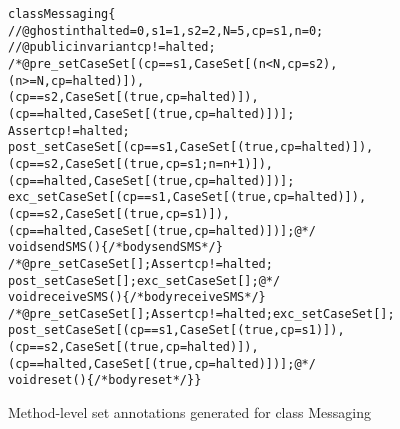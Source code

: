 \hspace{-0.2em}
\begin{figure}[t]
{\small\begin{alltt}
class Messaging \{
//@ ghost int halted = 0, s1 = 1, s2 = 2, N = 5, cp = s1, n = 0;
//@ public invariant cp != halted;\vspace*{.5em}
/*@ pre_set  CaseSet [(cp == s1, CaseSet [(n < N, cp = s2),
                                          (n >= N, cp = halted)]),
                      (cp == s2, CaseSet [(true, cp = halted)]),
                      (cp == halted, CaseSet [(true, cp = halted)])];
             Assert cp != halted;
    post_set CaseSet [(cp == s1, CaseSet [(true, cp = halted)]),
                      (cp == s2, CaseSet [(true, cp = s1; n = n + 1)]),
                      (cp == halted, CaseSet [(true, cp = halted)])];
    exc_set  CaseSet [(cp == s1, CaseSet [(true, cp = halted)]),
                      (cp == s2, CaseSet [(true, cp = s1)]),
                      (cp == halted, CaseSet [(true, cp = halted)])]; @*/
void sendSMS()\{/* body sendSMS */\}\vspace*{.5em}
/*@ pre_set  CaseSet []; Assert cp != halted;
    post_set CaseSet []; exc_set  CaseSet []; @*/
void receiveSMS()\{/* body receiveSMS */\}\vspace*{.5em}
/*@ pre_set  CaseSet []; Assert cp != halted; exc_set CaseSet [];
    post_set CaseSet [(cp == s1, CaseSet [(true, cp = s1)]),
                      (cp == s2, CaseSet [(true, cp = halted)]),
                      (cp == halted, CaseSet [(true, cp = halted)])]; @*/
void reset() \{/* body reset */\} \}\end{alltt}\vspace*{-.5em}}
\caption{Method-level set annotations generated for class Messaging}\label{FigExampleStep2}
\end{figure}

\vspace*{-1.5em}
